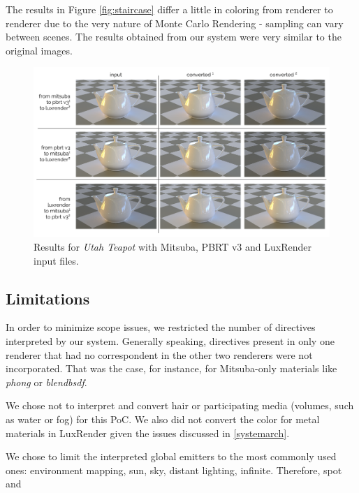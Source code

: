 The results in Figure \ref{fig:staircase} differ a little in coloring from 
renderer to renderer due to the very nature of Monte Carlo Rendering - sampling 
can vary between scenes. The results obtained from our system were very similar 
to the original images.

\begin{figure}
\centering
\includegraphics[width=5in]{figs/4_results/results_teapot.png}
\caption{Results for \textit{Utah Teapot} with Mitsuba, PBRT v3 and LuxRender 
input files.}
\label{fig:teapot}
\end{figure}


\subsection{Limitations}
In order to minimize scope issues, we restricted the number of directives 
interpreted by our system. Generally speaking, directives present in only one 
renderer that had no correspondent in the other two renderers were not 
incorporated. That was the case, for instance, for Mitsuba-only materials like 
\textit{phong} or \textit{blendbsdf}. 

We chose not to interpret and convert hair or participating media (volumes, such 
as water or fog) for this PoC. We also did not convert the color for metal 
materials in LuxRender given the issues discussed in \ref{systemarch}.

We chose to limit the interpreted global emitters to the most commonly used 
ones: environment mapping, sun, sky, distant lighting, infinite. Therefore, spot 
and 



